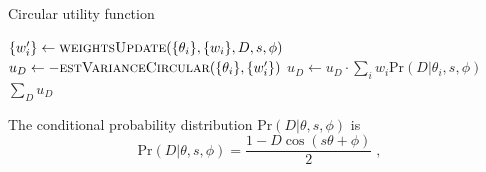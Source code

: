 \documentclass[aps, pra, 10pt, twocolumn, superscriptaddress,floatfix]{revtex4-1}
\begin{document}
%
%
\begin{algorithm}[H]
	\caption{Circular utility function}
	\label{alg:utilityNVcircular}
	\begin{algorithmic}[1]
			\State $\lbrace w_i' \rbrace \gets \Call{weightsUpdate}{\lbrace \theta_i \rbrace , \lbrace w_i \rbrace, D, s, \phi}$
			\State $u_D \gets - \Call{estVarianceCircular}{\lbrace \theta_i \rbrace, \lbrace w_i' \rbrace}$
			\State $u_D \gets u_D \cdot \sum_{i} w_i \text{Pr} \left(D | \theta_i, s, \phi \right)$
		\EndFor
		\State \Return $\sum_{D} u_D$
	\EndFunction 
	\end{algorithmic}
\end{algorithm}
%
The conditional probability distribution $\text{Pr} \left(D | \theta, s, \phi \right)$ is
%
\begin{equation}
	\text{Pr} \left(D | \theta, s, \phi \right) = \frac{1 - D \cos (s \theta + \phi) }{2} \; ,
\end{equation}
%
\end{document}
